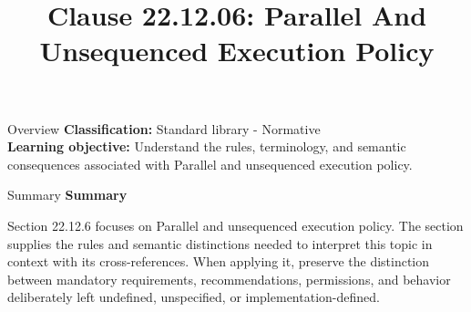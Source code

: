 \documentclass[10pt,letterpaper]{article}
\title{Clause 22.12.06: Parallel And Unsequenced Execution Policy}
\author{}
\date{}
\begin{document}
\maketitle
\begin{CornellOverviewBox}{Overview}
\textbf{Classification:} Standard library - Normative\\[2pt]
\textbf{Learning objective:} Understand the rules, terminology, and semantic consequences associated with Parallel and unsequenced execution policy.
\end{CornellOverviewBox}\begin{CornellSummaryBox}{Summary}
{\sffamily\bfseries\color{Accent} Summary}\par\vspace{3pt}Section 22.12.6 focuses on Parallel and unsequenced execution policy. The section supplies the rules and semantic distinctions needed to interpret this topic in context with its cross-references. When applying it, preserve the distinction between mandatory requirements, recommendations, permissions, and behavior deliberately left undefined, unspecified, or implementation-defined.
\end{CornellSummaryBox}
\end{document}
